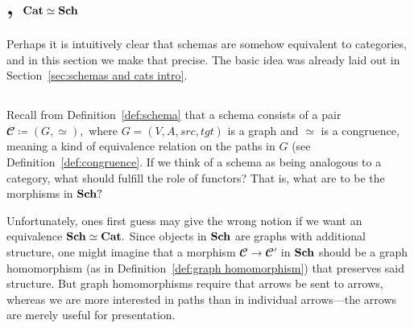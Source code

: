 \documentclass[../main/CT4S-EN-RU]{subfiles}
\begin{document}
\section{, \texorpdfstring{${\mathbf{Cat}}\simeq{\mathbf{Sch}}$}{Cat = Sch}}\label{sec:cat equiv sch}

\begin{blockENG}
Perhaps it is intuitively clear that schemas are somehow equivalent to categories, and in this section we make that precise. The basic idea was already laid out in Section~\ref{sec:schemas and cats intro}.
\end{blockENG}

\begin{blockRUS}
\end{blockRUS}


\subsection{}\label{sec:sch as category}

\begin{blockENG}
Recall from Definition~\ref{def:schema} that a schema consists of a pair ${𝓒}{\coloneqq}(G,\simeq),$ where $G=(V,A,src,tgt)$ is a graph and $\simeq$ is a congruence, meaning a kind of equivalence relation on the paths in $G$ (see Definition~\ref{def:congruence}. If we think of a schema as being analogous to a category, what should fulfill the role of functors? That is, what are to be the morphisms in ${\mathbf{Sch}}?$
\end{blockENG}

\begin{blockRUS}
\end{blockRUS}

\begin{blockENG}
Unfortunately, ones first guess may give the wrong notion if we want an equivalence ${\mathbf{Sch}}\simeq{\mathbf{Cat}}.$ Since objects in ${\mathbf{Sch}}$ are graphs with additional structure, one might imagine that a morphism ${𝓒}{→}{𝓒}'$ in ${\mathbf{Sch}}$ should be a graph homomorphism (as in Definition~\ref{def:graph homomorphism}) that preserves said structure. But graph homomorphisms require that arrows be sent to arrows, whereas we are more interested in paths than in individual arrows—the arrows are merely useful for presentation. 
\end{blockENG}
\end{document}
